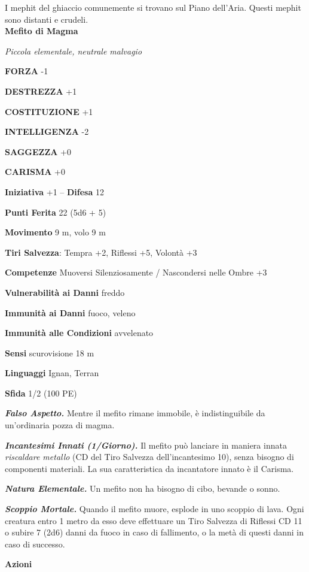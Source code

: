 \begin{multicols}{2}
I mephit del ghiaccio comunemente si trovano sul Piano dell'Aria. Questi mephit sono distanti e crudeli.\\


\medskip{}\textbf{Mefito di Magma}

\emph{Piccola elementale, neutrale malvagio}

\textbf{FORZA} -1

\textbf{DESTREZZA} +1

\textbf{COSTITUZIONE} +1

\textbf{INTELLIGENZA} -2

\textbf{SAGGEZZA} +0

\textbf{CARISMA} +0

\textbf{Iniziativa} +1 -- \textbf{Difesa} 12

\textbf{Punti Ferita} 22 (5d6 + 5)

\textbf{Movimento} 9 m, volo 9 m

\textbf{Tiri Salvezza}: Tempra +2, Riflessi +5, Volontà +3

\textbf{Competenze} Muoversi Silenziosamente / Nascondersi nelle Ombre +3

\textbf{Vulnerabilità ai Danni} freddo

\textbf{Immunità ai Danni} fuoco, veleno

\textbf{Immunità alle Condizioni} avvelenato

\textbf{Sensi} scurovisione 18 m

\textbf{Linguaggi} Ignan, Terran

\textbf{Sfida} 1/2 (100 PE)

\emph{\textbf{Falso Aspetto.}} Mentre il mefito rimane immobile, è indistinguibile da un'ordinaria pozza di magma.

\emph{\textbf{Incantesimi Innati (1/Giorno).}} Il mefito può lanciare in maniera innata \emph{riscaldare metallo} (CD del Tiro Salvezza dell'incantesimo 10), senza bisogno di componenti materiali. La sua caratteristica da incantatore innato è il Carisma.

\emph{\textbf{Natura Elementale.}} Un mefito non ha bisogno di cibo, bevande o sonno.

\emph{\textbf{Scoppio Mortale.}} Quando il mefito muore, esplode in uno scoppio di lava. Ogni creatura entro 1 metro da esso deve effettuare un Tiro Salvezza di Riflessi CD 11 o subire 7 (2d6) danni da fuoco in caso di fallimento, o la metà di questi danni in caso di successo.

\textbf{Azioni}


\end{multicols}
